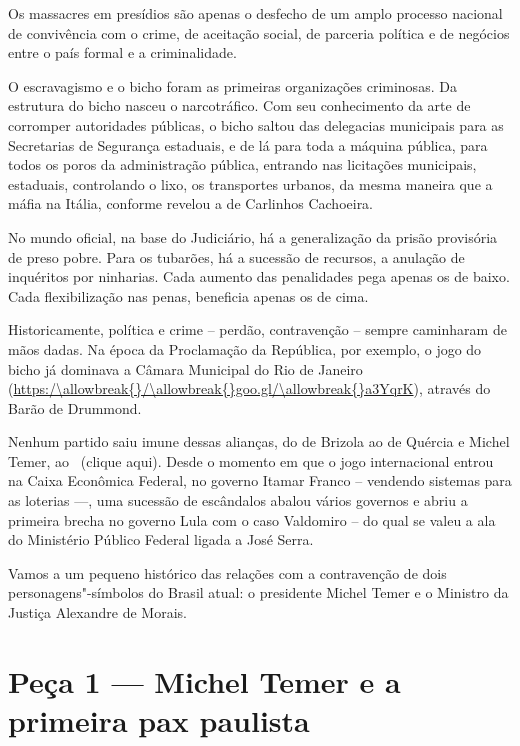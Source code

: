  

Os massacres em presídios são apenas o desfecho de um amplo processo
nacional de convivência com o crime, de aceitação social, de parceria
política e de negócios entre o país formal e a criminalidade.

O escravagismo e o bicho foram as primeiras organizações criminosas. Da
estrutura do bicho nasceu o narcotráfico. Com seu conhecimento da arte
de corromper autoridades públicas, o bicho saltou das delegacias
municipais para as Secretarias de Segurança estaduais, e de lá para toda
a máquina pública, para todos os poros da administração pública,
entrando nas licitações municipais, estaduais, controlando o lixo, os
transportes urbanos, da mesma maneira que a máfia na Itália, conforme
revelou a  de Carlinhos Cachoeira.

No mundo oficial, na base do Judiciário, há a generalização da prisão
provisória de preso pobre. Para os tubarões, há a sucessão de recursos,
a anulação de inquéritos por ninharias. Cada aumento das penalidades
pega apenas os de baixo. Cada flexibilização nas penas, beneficia apenas
os de cima.

Historicamente, política e crime -- perdão, contravenção -- sempre
caminharam de mãos dadas. Na época da Proclamação da República, por
exemplo, o jogo do bicho já dominava a Câmara Municipal do Rio de
Janeiro (\url{https:/\allowbreak{}/\allowbreak{}goo.gl/\allowbreak{}a3YqrK}), através do Barão de Drummond.

Nenhum partido saiu imune dessas alianças, do  de Brizola ao  de
Quércia e Michel Temer, ao
~{(clique
aqui}). Desde o momento em que o jogo internacional entrou na Caixa
Econômica Federal, no governo Itamar Franco -- vendendo sistemas para as
loterias \mbox{---,} uma sucessão de escândalos abalou vários governos e abriu
a primeira brecha no governo Lula com o caso Valdomiro -- do qual se
valeu a ala do Ministério Público Federal ligada a José Serra.

Vamos a um pequeno histórico das relações com a contravenção de dois
personagens"-símbolos do Brasil atual: o presidente Michel Temer e o
Ministro da Justiça Alexandre de Morais.

\section{Peça 1 --- Michel Temer e a primeira pax paulista}

